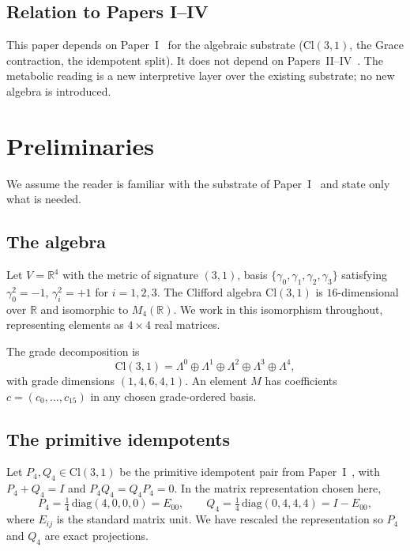 \documentclass[11pt,a4paper]{article}
\theoremstyle{plain}
\theoremstyle{definition}
\theoremstyle{remark}
\numberwithin{equation}{section}
\providecommand{\Cl}{\mathrm{Cl}}
\providecommand{\R}{\mathbb{R}}
\providecommand{\Pf}{P_4}
\providecommand{\Qf}{Q_4}
\begin{document}
\subsection*{Relation to Papers I--IV}

This paper depends on Paper~I~\cite{paper-I} for the algebraic substrate
($\Cl(3,1)$, the Grace contraction, the idempotent split). It does
not depend on Papers~II--IV~\cite{paper-II,paper-III,paper-IV}. The metabolic reading is a new
interpretive layer over the existing substrate; no new algebra
is introduced.

\section{Preliminaries}
\label{sec:prelim}

We assume the reader is familiar with the substrate of Paper~I~\cite{paper-I} and
state only what is needed.

\subsection{The algebra}

Let $V = \R^4$ with the metric of signature $(3,1)$, basis
$\{\gamma_0, \gamma_1, \gamma_2, \gamma_3\}$ satisfying
$\gamma_0^2 = -1$, $\gamma_i^2 = +1$ for $i = 1,2,3$. The Clifford
algebra $\Cl(3,1)$ is $16$-dimensional over $\R$ and isomorphic to
$M_4(\R)$. We work in this isomorphism throughout, representing
elements as $4 \times 4$ real matrices.

The grade decomposition is
\[
\Cl(3,1) = \Lambda^0 \oplus \Lambda^1 \oplus \Lambda^2 \oplus \Lambda^3 \oplus \Lambda^4,
\]
with grade dimensions $(1, 4, 6, 4, 1)$. An element $M$ has
coefficients $c = (c_0, \ldots, c_{15})$ in any chosen grade-ordered
basis.

\subsection{The primitive idempotents}

Let $\Pf, \Qf \in \Cl(3,1)$ be the primitive idempotent pair from
Paper~I~\cite{paper-I}, with $\Pf + \Qf = I$ and $\Pf\Qf = \Qf\Pf = 0$. In the
matrix representation chosen here,
\[
\Pf = \tfrac{1}{4}\,\mathrm{diag}(4, 0, 0, 0) = E_{00}, \qquad
\Qf = \tfrac{1}{4}\,\mathrm{diag}(0, 4, 4, 4) = I - E_{00},
\]
where $E_{ij}$ is the standard matrix unit. We have rescaled the
representation so $\Pf$ and $\Qf$ are exact projections.
\end{document}
